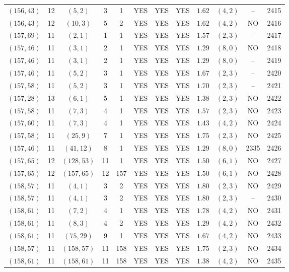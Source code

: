 \begin{longtable}{|c|c|c|c|c|c|c|c|c|c|c|c|}
$(156,43)$ & 12 & $(5,2)$ & 3 & 1 & YES & YES & YES & $1.62$ & $(4,2)$ & -- & 2415\\
$(156,43)$ & 12 & $(10,3)$ & 5 & 2 & YES & YES & YES & $1.62$ & $(4,2)$ & NO & 2416\\
$(157,69)$ & 11 & $(2,1)$ & 1 & 1 & YES & YES & YES & $1.57$ & $(2,3)$ & -- & 2417\\
$(157,46)$ & 11 & $(3,1)$ & 2 & 1 & YES & YES & YES & $1.29$ & $(8,0)$ & NO & 2418\\
$(157,46)$ & 11 & $(3,1)$ & 2 & 1 & YES & YES & YES & $1.29$ & $(8,0)$ & -- & 2419\\
$(157,46)$ & 11 & $(5,2)$ & 3 & 1 & YES & YES & YES & $1.67$ & $(2,3)$ & -- & 2420\\
$(157,58)$ & 11 & $(5,2)$ & 3 & 1 & YES & YES & YES & $1.70$ & $(2,3)$ & -- & 2421\\
$(157,28)$ & 13 & $(6,1)$ & 5 & 1 & YES & YES & YES & $1.38$ & $(2,3)$ & NO & 2422\\
$(157,58)$ & 11 & $(7,3)$ & 4 & 1 & YES & YES & YES & $1.57$ & $(2,3)$ & NO & 2423\\
$(157,60)$ & 11 & $(7,3)$ & 4 & 1 & YES & YES & YES & $1.43$ & $(4,2)$ & NO & 2424\\
$(157,58)$ & 11 & $(25,9)$ & 7 & 1 & YES & YES & YES & $1.75$ & $(2,3)$ & NO & 2425\\
$(157,46)$ & 11 & $(41,12)$ & 8 & 1 & YES & YES & YES & $1.29$ & $(8,0)$ & 2335 & 2426\\
$(157,65)$ & 12 & $(128,53)$ & 11 & 1 & YES & YES & YES & $1.50$ & $(6,1)$ & NO & 2427\\
$(157,65)$ & 12 & $(157,65)$ & 12 & 157 & YES & YES & YES & $1.50$ & $(6,1)$ & NO & 2428\\
$(158,57)$ & 11 & $(4,1)$ & 3 & 2 & YES & YES & YES & $1.80$ & $(2,3)$ & NO & 2429\\
$(158,57)$ & 11 & $(4,1)$ & 3 & 2 & YES & YES & YES & $1.80$ & $(2,3)$ & -- & 2430\\
$(158,61)$ & 11 & $(7,2)$ & 4 & 1 & YES & YES & YES & $1.78$ & $(4,2)$ & NO & 2431\\
$(158,61)$ & 11 & $(8,3)$ & 4 & 2 & YES & YES & YES & $1.29$ & $(4,2)$ & NO & 2432\\
$(158,61)$ & 11 & $(75,29)$ & 9 & 1 & YES & YES & YES & $1.67$ & $(4,2)$ & NO & 2433\\
$(158,57)$ & 11 & $(158,57)$ & 11 & 158 & YES & YES & YES & $1.75$ & $(2,3)$ & NO & 2434\\
$(158,61)$ & 11 & $(158,61)$ & 11 & 158 & YES & YES & YES & $1.38$ & $(4,2)$ & NO & 2435\\

\end{longtable}
